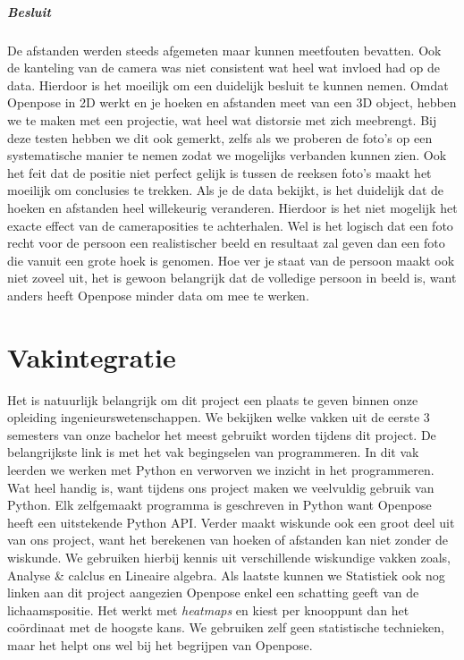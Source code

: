 \documentclass[a4paper,twoside,kulak]{kulakreport}
\begin{document}
\paragraph{Besluit}
De afstanden werden steeds afgemeten maar kunnen meetfouten bevatten. Ook de kanteling van de camera was niet consistent wat heel wat invloed had op de data. Hierdoor is het moeilijk om een duidelijk besluit te kunnen nemen. Omdat Openpose in 2D werkt en je hoeken en afstanden meet van een 3D object, hebben we te maken met een projectie, wat heel wat distorsie met zich meebrengt. Bij deze testen hebben we dit ook gemerkt, zelfs als we proberen de foto’s op een systematische manier te nemen zodat we mogelijks verbanden kunnen zien. Ook het feit dat de positie niet perfect gelijk is tussen de reeksen foto’s maakt het moeilijk om conclusies te trekken. Als je de data bekijkt, is het duidelijk dat de hoeken en afstanden heel willekeurig veranderen. Hierdoor is het niet mogelijk het exacte effect van de cameraposities te achterhalen. Wel is het logisch dat een foto recht voor de persoon een realistischer beeld en resultaat zal geven dan een foto die vanuit een grote hoek is genomen. Hoe ver je staat van de persoon maakt ook niet zoveel uit, het is gewoon belangrijk dat de volledige persoon in beeld is, want anders heeft Openpose minder data om mee te werken.

 
\chapter{Vakintegratie}
Het is natuurlijk belangrijk om dit project een plaats te geven binnen onze opleiding ingenieurswetenschappen. We bekijken welke vakken uit de eerste 3 semesters van onze bachelor het meest gebruikt worden tijdens dit project. De belangrijkste link is met het vak begingselen van programmeren. In dit vak leerden we werken met Python en verworven we inzicht in het programmeren. Wat heel handig is, want tijdens ons project maken we veelvuldig gebruik van Python. Elk zelfgemaakt programma is geschreven in Python want Openpose heeft een uitstekende Python API. Verder maakt wiskunde ook een groot deel uit van ons project, want het berekenen van hoeken of afstanden kan niet zonder de wiskunde. We gebruiken hierbij kennis uit verschillende wiskundige vakken zoals, Analyse \& calclus en Lineaire algebra. Als laatste kunnen we Statistiek ook nog linken aan dit project aangezien Openpose enkel een schatting geeft van de lichaamspositie. Het werkt met \textit{heatmaps} en kiest per knooppunt dan het coördinaat met de hoogste kans. We gebruiken zelf geen statistische technieken, maar het helpt ons wel bij het begrijpen van Openpose.
\end{document}
